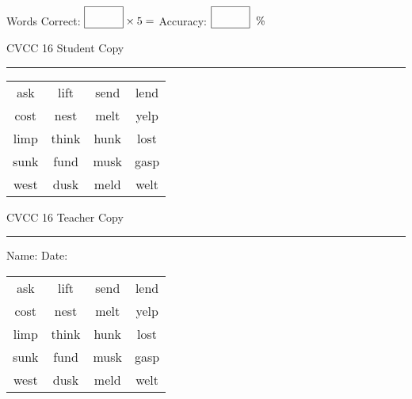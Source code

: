 \documentclass{memoir}
\begin{document}
\small

Words Correct: $\fbox{\phantom{\huge 100}} \times 5 = $ Accuracy: $\fbox{\phantom{\huge 100}}\;\; \%$ 

\vfill

\newpage


\footnotesize \noindent
CVCC 16 \hfill Student Copy
\smallskip
\hrule

\Large

\setlength{\tabcolsep}{14pt}
\def\arraystretch{3}

{\selectfont


\begin{vplace}[0.5]
\begin{center}
\begin{tabular}{cccc}
ask  & lift & send & lend \\
cost & nest & melt & yelp \\
limp & think & hunk & lost \\
sunk & fund & musk & gasp \\
west & dusk & meld & welt \\
\end{tabular}
\end{center}
\end{vplace}

}

\newpage

\footnotesize \noindent
CVCC 16 \hfill Teacher Copy
\smallskip
\hrule

\small

\vfill

\noindent
Name: \underline{\hspace{1.75in}} \hfill Date: \underline{\hspace{1in}}

\Large

{\selectfont


\begin{vplace}[0.5]
\begin{center}
\begin{tabular}{cccc}
ask  & lift & send & lend \\
cost & nest & melt & yelp \\
limp & think & hunk & lost \\
sunk & fund & musk & gasp \\
west & dusk & meld & welt \\
\end{tabular}
\end{center}
\end{vplace}



}
\end{document}
